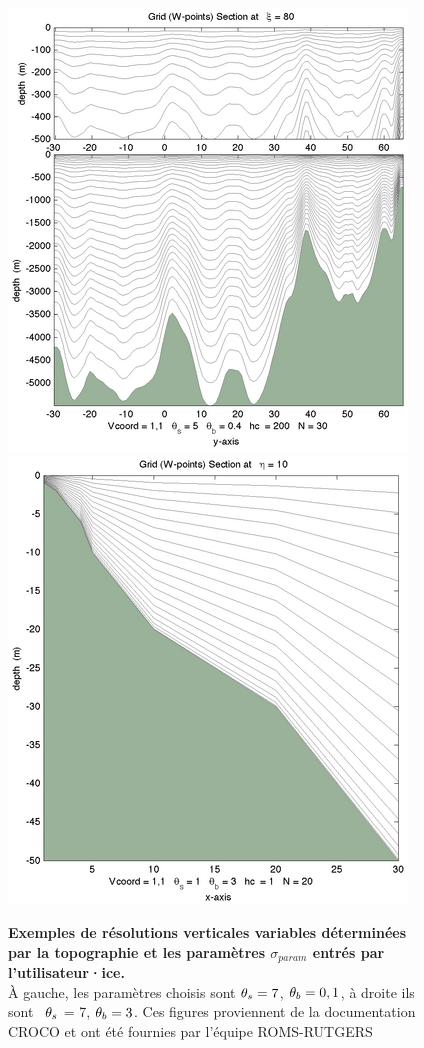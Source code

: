 \documentclass[10pt,a4paper,titlepage]{article}
\begin{document}
    \begin{figure}[h!]
        \centering
        \includegraphics{../images/vcoord_ex1.png}
        \includegraphics{../images/vcoord_ex5.png}
        \caption{\textbf{Exemples de résolutions verticales variables déterminées par la topographie et les paramètres  $\sigma_{param}$ entrés par l'utilisateur·ice.} \\
            À gauche, les paramètres choisis sont  $\protect\theta_s = 7$, $\protect\theta_b = 0,1$, à droite ils sont  $\protect\theta_s$ = 7, $\protect\theta_b = 3$.
            Ces figures proviennent de la documentation CROCO \cite{grid_doc} et ont été fournies par l'équipe ROMS-RUTGERS}
        \label{fig:vertical_resolution}
    \end{figure}
    
\end{document}

